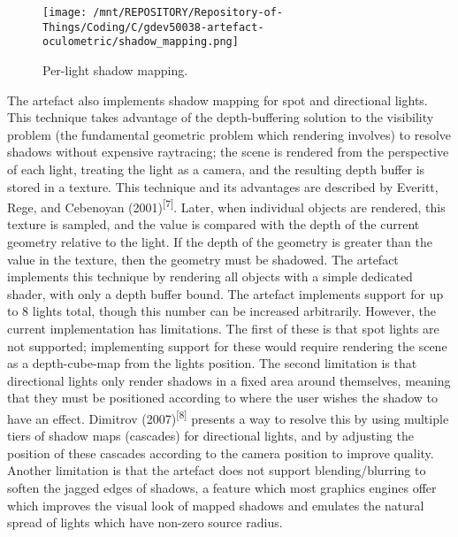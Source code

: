\documentclass[
]{article}
\begin{document}
{\begin{figure}[H]
\texttt{[image: /mnt/REPOSITORY/Repository-of-Things/Coding/C/gdev50038-artefact-oculometric/shadow\_mapping.png]}
\caption{\label{fig:figure2} Per-light shadow mapping.}
\end{figure}
The artefact also implements shadow mapping for spot and directional
lights. This technique takes advantage of the depth-buffering solution
to the visibility problem (the fundamental geometric problem which
rendering involves) to resolve shadows without expensive raytracing; the
scene is rendered from the perspective of each light, treating the light
as a camera, and the resulting depth buffer is stored in a texture. This
technique and its advantages are described by Everitt, Rege, and
Cebenoyan (2001)\textsuperscript{{[}7{]}}. Later, when individual
objects are rendered, this texture is sampled, and the value is compared
with the depth of the current geometry relative to the light. If the
depth of the geometry is greater than the value in the texture, then the
geometry must be shadowed. The artefact implements this technique by
rendering all objects with a simple dedicated shader, with only a depth
buffer bound. The artefact implements support for up to 8 lights total,
though this number can be increased arbitrarily. However, the current
implementation has limitations. The first of these is that spot lights
are not supported; implementing support for these would require
rendering the scene as a depth-cube-map from the light\textquotesingle s
position. The second limitation is that directional lights only render
shadows in a fixed area around themselves, meaning that they must be
positioned according to where the user wishes the shadow to have an
effect. Dimitrov (2007)\textsuperscript{{[}8{]}} presents a way to
resolve this by using multiple tiers of shadow maps (cascades) for
directional lights, and by adjusting the position of these cascades
according to the camera position to improve quality. Another limitation is that the artefact does not support blending/blurring to soften the jagged edges of shadows, a feature which most graphics engines offer which improves the visual look of mapped shadows and emulates the natural spread of lights which have non-zero source radius.\\

}
\end{document}
